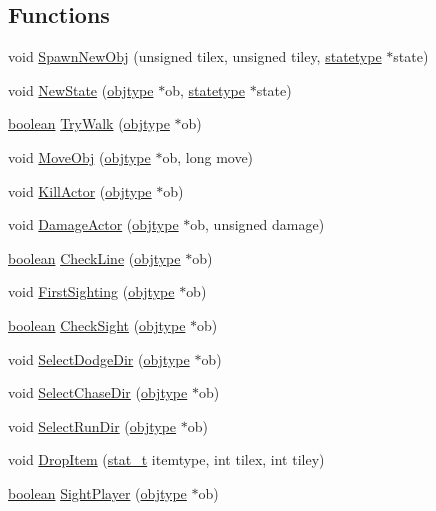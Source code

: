 \subsection*{Functions}
\begin{DoxyCompactItemize}
\item 
void \hyperlink{WL__STATE_8C_a2672e808d8c088645b48e17c1f3608ce}{SpawnNewObj} (unsigned tilex, unsigned tiley, \hyperlink{structstatestruct}{statetype} $\ast$state)
\item 
void \hyperlink{WL__STATE_8C_aefe4aac0ca3aa18b1943d8e096162a13}{NewState} (\hyperlink{structobjstruct}{objtype} $\ast$ob, \hyperlink{structstatestruct}{statetype} $\ast$state)
\item 
\hyperlink{ID__HEAD_8H_a7c6368b321bd9acd0149b030bb8275ed}{boolean} \hyperlink{WL__STATE_8C_afc2aee564bbde3329ca837f177130917}{TryWalk} (\hyperlink{structobjstruct}{objtype} $\ast$ob)
\item 
void \hyperlink{WL__STATE_8C_acc590a0c3cb09dd88e7727cbed040ec4}{MoveObj} (\hyperlink{structobjstruct}{objtype} $\ast$ob, long move)
\item 
void \hyperlink{WL__STATE_8C_ab414c5cb884ce9d89439a787a5b8c8de}{KillActor} (\hyperlink{structobjstruct}{objtype} $\ast$ob)
\item 
void \hyperlink{WL__STATE_8C_a0dd7c0f5423efb70928fd80fa08e013a}{DamageActor} (\hyperlink{structobjstruct}{objtype} $\ast$ob, unsigned damage)
\item 
\hyperlink{ID__HEAD_8H_a7c6368b321bd9acd0149b030bb8275ed}{boolean} \hyperlink{WL__STATE_8C_ad9ba23a7cef5028a4aafaa790c89ef9e}{CheckLine} (\hyperlink{structobjstruct}{objtype} $\ast$ob)
\item 
void \hyperlink{WL__STATE_8C_a222e7af294ae4981ffac72c16b9f7a01}{FirstSighting} (\hyperlink{structobjstruct}{objtype} $\ast$ob)
\item 
\hyperlink{ID__HEAD_8H_a7c6368b321bd9acd0149b030bb8275ed}{boolean} \hyperlink{WL__STATE_8C_a78d1b5b5a62255da160d304dedbe2eae}{CheckSight} (\hyperlink{structobjstruct}{objtype} $\ast$ob)
\item 
void \hyperlink{WL__STATE_8C_abf00c4afcd01d66f8b6ba4d9b308ce6f}{SelectDodgeDir} (\hyperlink{structobjstruct}{objtype} $\ast$ob)
\item 
void \hyperlink{WL__STATE_8C_aaa5f3bd33e28df6ee38db0b950fb1b45}{SelectChaseDir} (\hyperlink{structobjstruct}{objtype} $\ast$ob)
\item 
void \hyperlink{WL__STATE_8C_a160d81dd6ea23ee5cee5cd31d6b9c627}{SelectRunDir} (\hyperlink{structobjstruct}{objtype} $\ast$ob)
\item 
void \hyperlink{WL__STATE_8C_ade1f64f9cd6e724d30037ed9e503037a}{DropItem} (\hyperlink{WL__DEF_8H_aba6727854ac6a393ef9918fe0c42500f}{stat\_\-t} itemtype, int tilex, int tiley)
\item 
\hyperlink{ID__HEAD_8H_a7c6368b321bd9acd0149b030bb8275ed}{boolean} \hyperlink{WL__STATE_8C_a3a43f9647b8793707a682d5507017ecd}{SightPlayer} (\hyperlink{structobjstruct}{objtype} $\ast$ob)
\end{DoxyCompactItemize}
